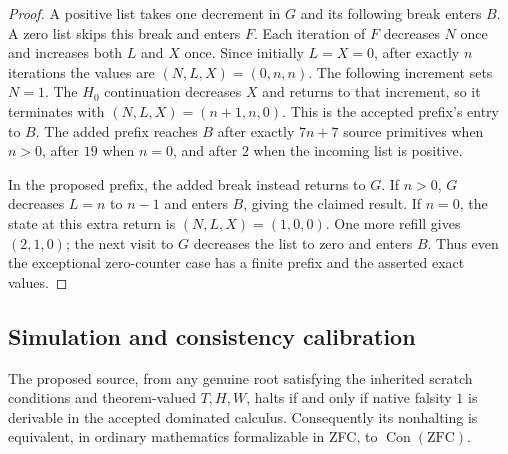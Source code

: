 \begin{proof}
A positive list takes one decrement in $G$ and its following break
enters $B$. A zero list skips this break and enters $F$. Each iteration
of $F$ decreases $N$ once and increases both $L$ and $X$ once. Since
initially $L=X=0$, after exactly $n$ iterations the values are
$(N,L,X)=(0,n,n)$. The following increment sets $N=1$.
The $H_0$ continuation decreases $X$ and returns to that increment,
so it terminates with $(N,L,X)=(n+1,n,0)$.
This is the accepted prefix's entry to $B$. The added prefix reaches
$B$ after exactly $7n+7$ source primitives when $n>0$, after $19$
when $n=0$, and after $2$ when the incoming list is positive.

In the proposed prefix, the added break instead returns to $G$.
If $n>0$, $G$ decreases $L=n$ to $n-1$ and enters $B$, giving the
claimed result. If $n=0$, the state at this extra return is
$(N,L,X)=(1,0,0)$. One more refill gives $(2,1,0)$; the next visit to
$G$ decreases the list to zero and enters $B$. Thus even the exceptional
zero-counter case has a finite prefix and the asserted exact values.
\end{proof}

\subsection{Simulation and consistency calibration}

\begin{theorem}
\label{thm:refill-calibration}
The proposed source, from any genuine root satisfying the inherited
scratch conditions and theorem-valued $T,H,W$, halts if and only if
native falsity $1$ is derivable in the accepted dominated calculus.
Consequently its nonhalting is equivalent, in ordinary mathematics
formalizable in ZFC, to $\operatorname{Con}(\mathrm{ZFC})$.
\end{theorem}

